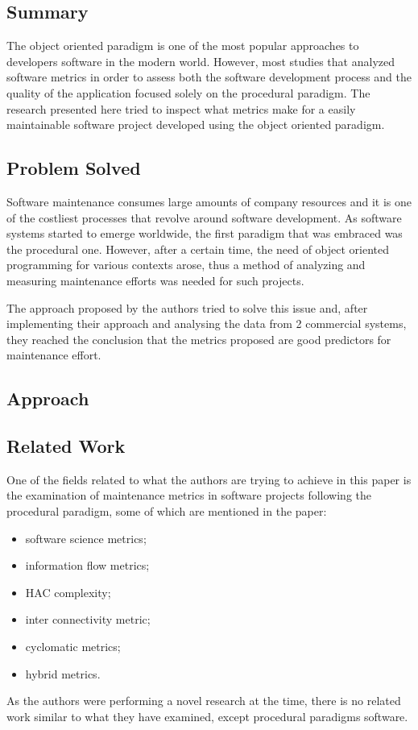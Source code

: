 \documentclass[a4paper,portrait,12pt]{article}
\begin{document}
\subsection{Summary}
 The object oriented paradigm is one of the most popular approaches to developers
 software in the modern world. However, most studies that analyzed software 
 metrics in order to assess both the software development process and the
 quality of the application focused solely on the procedural paradigm. 
 The research presented here tried to inspect what metrics make for a easily
 maintainable software project developed using the object oriented paradigm.

\subsection{Problem Solved}
Software maintenance consumes large amounts of company resources and it is
one of the costliest processes that revolve around software development.
As software systems started to emerge worldwide, the first paradigm that
was embraced was the procedural one. However, after a certain time, the need
of object oriented programming for various contexts arose, thus a method of
analyzing and measuring maintenance efforts was needed for such projects.

The approach proposed by the authors tried to solve this issue and, after 
implementing their approach and analysing the data from 2 commercial systems,
they reached the conclusion that the metrics proposed are good predictors
for maintenance effort.

\subsection{Approach}


\subsection{Related Work}
One of the fields related to what the authors are trying to achieve in this
paper is the examination of maintenance metrics in software projects following
the procedural paradigm, some of which are mentioned in the paper:
 \begin{itemize}
  \item \citet{halstead1977elements} software science metrics;
  \item \citet{henry1981software} information flow metrics;
  \item \citet{bail1988program} HAC complexity;
  \item \citet{robillard1989interconnectivity} inter connectivity metric;
  \item \citet{mccabe1976complexity} cyclomatic metrics;
  \item \citet{adamov1990proposal} hybrid metrics.
 \end{itemize}
As the authors were performing a novel research at the time, there is no
related work similar to what they have examined, except procedural paradigms
software.
\end{document}
